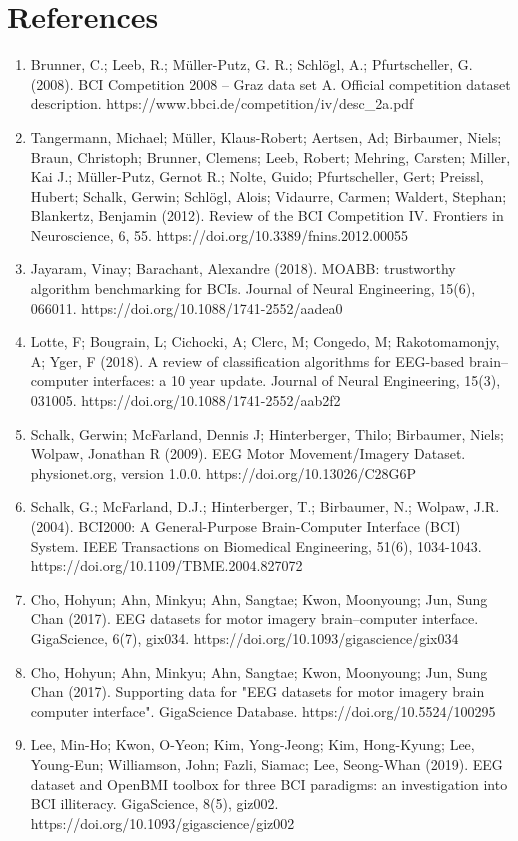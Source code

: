 \documentclass[11pt]{article}
\begin{document}
\section*{References}
\begin{enumerate}
\item Brunner, C.; Leeb, R.; Müller-Putz, G. R.; Schlögl, A.; Pfurtscheller, G. (2008). BCI Competition 2008 -- Graz data set A. Official competition dataset description. https://www.bbci.de/competition/iv/desc\_2a.pdf
\item Tangermann, Michael; Müller, Klaus-Robert; Aertsen, Ad; Birbaumer, Niels; Braun, Christoph; Brunner, Clemens; Leeb, Robert; Mehring, Carsten; Miller, Kai J.; Müller-Putz, Gernot R.; Nolte, Guido; Pfurtscheller, Gert; Preissl, Hubert; Schalk, Gerwin; Schlögl, Alois; Vidaurre, Carmen; Waldert, Stephan; Blankertz, Benjamin (2012). Review of the BCI Competition IV. Frontiers in Neuroscience, 6, 55. https://doi.org/10.3389/fnins.2012.00055
\item Jayaram, Vinay; Barachant, Alexandre (2018). MOABB: trustworthy algorithm benchmarking for BCIs. Journal of Neural Engineering, 15(6), 066011. https://doi.org/10.1088/1741-2552/aadea0
\item Lotte, F; Bougrain, L; Cichocki, A; Clerc, M; Congedo, M; Rakotomamonjy, A; Yger, F (2018). A review of classification algorithms for EEG-based brain--computer interfaces: a 10 year update. Journal of Neural Engineering, 15(3), 031005. https://doi.org/10.1088/1741-2552/aab2f2
\item Schalk, Gerwin; McFarland, Dennis J; Hinterberger, Thilo; Birbaumer, Niels; Wolpaw, Jonathan R (2009). EEG Motor Movement/Imagery Dataset. physionet.org, version 1.0.0. https://doi.org/10.13026/C28G6P
\item Schalk, G.; McFarland, D.J.; Hinterberger, T.; Birbaumer, N.; Wolpaw, J.R. (2004). BCI2000: A General-Purpose Brain-Computer Interface (BCI) System. IEEE Transactions on Biomedical Engineering, 51(6), 1034-1043. https://doi.org/10.1109/TBME.2004.827072
\item Cho, Hohyun; Ahn, Minkyu; Ahn, Sangtae; Kwon, Moonyoung; Jun, Sung Chan (2017). EEG datasets for motor imagery brain--computer interface. GigaScience, 6(7), gix034. https://doi.org/10.1093/gigascience/gix034
\item Cho, Hohyun; Ahn, Minkyu; Ahn, Sangtae; Kwon, Moonyoung; Jun, Sung Chan (2017). Supporting data for "EEG datasets for motor imagery brain computer interface". GigaScience Database. https://doi.org/10.5524/100295
\item Lee, Min-Ho; Kwon, O-Yeon; Kim, Yong-Jeong; Kim, Hong-Kyung; Lee, Young-Eun; Williamson, John; Fazli, Siamac; Lee, Seong-Whan (2019). EEG dataset and OpenBMI toolbox for three BCI paradigms: an investigation into BCI illiteracy. GigaScience, 8(5), giz002. https://doi.org/10.1093/gigascience/giz002

\end{enumerate}
\end{document}
